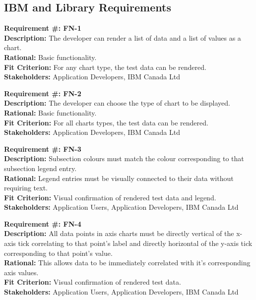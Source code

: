 \documentclass[12pt, titlepage]{article}
\begin{document}
\subsection{IBM and Library Requirements}
\begin{flushleft}
\textbf{Requirement \#: FN-1} \\
\textbf{Description:} The developer can render a list of data and a list of values as a chart.  \\
\textbf{Rational:} Basic functionality. \\
\textbf{Fit Criterion:} For any chart type, the test data can be rendered. \\
\textbf{Stakeholders:} Application Developers, IBM Canada Ltd \\ 
\end{flushleft}
\begin{flushleft}
\textbf{Requirement \#: FN-2} \\
\textbf{Description:} The developer can choose the type of chart to be displayed. \\
\textbf{Rational:} Basic functionality. \\
\textbf{Fit Criterion:} For all charts types, the test data can be rendered. \\
\textbf{Stakeholders:} Application Developers, IBM Canada Ltd\\
\end{flushleft}
\begin{flushleft}
\textbf{Requirement \#: FN-3} \\
\textbf{Description:} Subsection colours must match the colour corresponding to that subsection legend entry. \\
\textbf{Rational:} Legend entries must be visually connected to their data without requiring text. \\
\textbf{Fit Criterion:} Visual confirmation of rendered test data and legend. \\
\textbf{Stakeholders:} Application Users, Application Developers, IBM Canada Ltd\\
\end{flushleft}
\begin{flushleft}
\textbf{Requirement \#: FN-4} \\
\textbf{Description:} All data points in axis charts must be directly vertical of the x-axis tick correlating to that point's label and directly horizontal of the y-axis tick corresponding to that point's value. \\
\textbf{Rational:} This allows data to be immediately correlated with it's corresponding axis values. \\
\textbf{Fit Criterion:} Visual confirmation of rendered test data. \\
\textbf{Stakeholders:} Application Users, Application Developers, IBM Canada Ltd\\
\end{flushleft}
\end{document}
